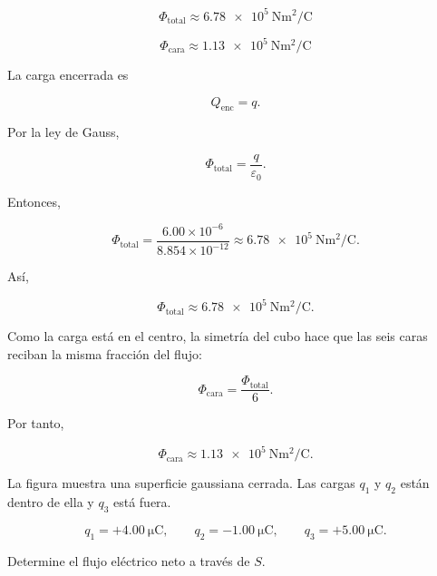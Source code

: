 \begin{respuesta}

\[
\boxed{
\Phi_{\text{total}}
\approx
\SI{6.78e5}{\newton\metre\squared\per\coulomb}
}
\]

\[
\boxed{
\Phi_{\text{cara}}
\approx
\SI{1.13e5}{\newton\metre\squared\per\coulomb}
}
\]

\end{respuesta}

\begin{explicacion}

La carga encerrada es

\[
Q_{\text{enc}}=q.
\]

Por la ley de Gauss,

\[
\Phi_{\text{total}}=\frac{q}{\varepsilon_0}.
\]

Entonces,

\[
\Phi_{\text{total}}
=
\frac{6.00\times10^{-6}}{8.854\times10^{-12}}
\approx
\SI{6.78e5}{\newton\metre\squared\per\coulomb}.
\]

Así,

\[
\boxed{
\Phi_{\text{total}}
\approx
\SI{6.78e5}{\newton\metre\squared\per\coulomb}
}.
\]

Como la carga está en el centro, la simetría del cubo hace que las seis caras reciban
la misma fracción del flujo:

\[
\Phi_{\text{cara}}
=
\frac{\Phi_{\text{total}}}{6}.
\]

Por tanto,

\[
\boxed{
\Phi_{\text{cara}}
\approx
\SI{1.13e5}{\newton\metre\squared\per\coulomb}
}.
\]

\end{explicacion}


\begin{ejercicio}

La figura muestra una superficie gaussiana cerrada. Las cargas \(q_1\) y \(q_2\)
están dentro de ella y \(q_3\) está fuera.

\[
q_1=+\SI{4.00}{\micro\coulomb},\qquad
q_2=-\SI{1.00}{\micro\coulomb},\qquad
q_3=+\SI{5.00}{\micro\coulomb}.
\]

\begin{center}
\end{center}

Determine el flujo eléctrico neto a través de \(S\).

\end{ejercicio}

